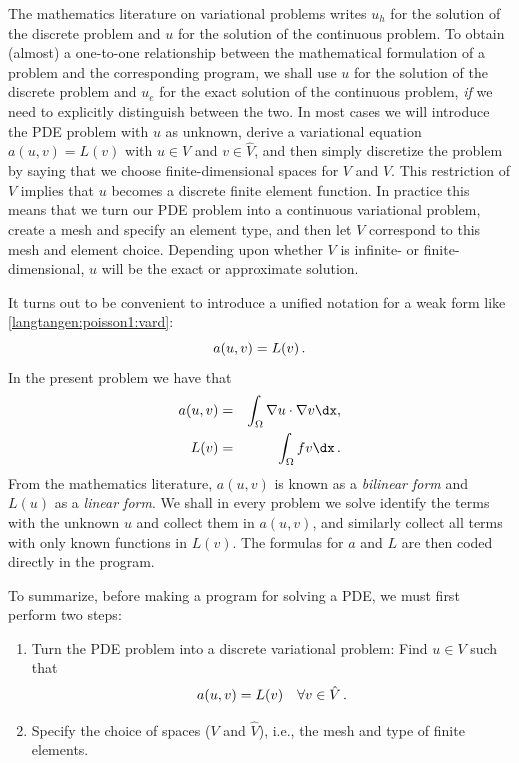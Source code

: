 The mathematics literature on variational problems writes $u_h$ for
the solution of the discrete problem and $u$ for the solution of the
continuous problem. To obtain (almost) a one-to-one relationship
between the mathematical formulation of a problem and the
corresponding \fenics{} program, we shall use $u$ for the solution of
the discrete problem and $u_{e}$ for the exact solution of the
continuous problem, \emph{if} we need to explicitly distinguish
between the two.  In most cases we will introduce the PDE problem with
$u$ as unknown, derive a variational equation $a(u,v)=L(v)$ with $u\in
V$ and $v\in \hat V$, and then simply discretize the problem by saying
that we choose finite-dimensional spaces for $V$ and $\hat V$. This
restriction of $V$ implies that $u$ becomes a discrete finite element
function.  In practice this means that we turn our PDE problem into a
continuous variational problem, create a mesh and specify an element
type, and then let $V$ correspond to this mesh and element choice.
Depending upon whether $V$ is infinite- or finite-dimensional, $u$
will be the exact or approximate solution.

It turns out to be convenient to
introduce a unified notation for a weak form
like \eqref{langtangen:poisson1:vard}:
\begin{equation}
a(u, v) = L(v)\thinspace .
\end{equation}
In the present problem we have that
\begin{eqnarray}
a(u, v) &=& \int_{\Omega} \nabla u \cdot \nabla v \dx,
\label{langtangen:poisson1:vard:a}\\
L(v) &=& \int_{\Omega} fv \dx\langtangenep\label{langtangen:poisson1:vard:L}
\end{eqnarray}
From the mathematics literature,
$a(u,v)$ is known as a \emph{bilinear form} and $L(u)$ as a 
\emph{linear form}.
We shall in every problem we solve identify the terms with the
unknown $u$ and collect them in $a(u,v)$, and similarly collect
all terms with only known functions in $L(v)$. The formulas for $a$ and
$L$ are then coded directly in the program.

To summarize, before making a \fenics{} program for solving a PDE,
we must first perform two steps:
\begin{enumerate}
\item Turn the PDE problem into a discrete 
variational problem: Find $u\in V$
such that
\[ a(u,v) = L(v)\quad\forall v\in \hat{V}\thinspace . \]
\item Specify the choice of spaces ($V$ and $\hat V$), 
i.e., the mesh and type of finite elements.
\end{enumerate}

